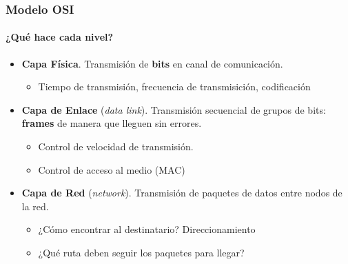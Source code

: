 \documentclass[letter]{beamer}
\begin{document}
\begin{frame}
  \frametitle{Modelo OSI}
  \framesubtitle{¿Qué hace cada nivel?}

  \begin{itemize}
    \item {\bf Capa Física}. Transmisión de {\bf bits} en canal de comunicación.
      \begin{itemize}
        \item Tiempo de transmisión, frecuencia de transmisición, codificación
      \end{itemize}
    \item {\bf Capa de Enlace} ({\em data link}). Transmisión secuencial de grupos de bits: {\bf frames}
          de manera que lleguen sin errores.
      \begin{itemize}
        \item Control de velocidad de transmisión.
        \item Control de acceso al medio (MAC)
      \end{itemize}
    \item {\bf Capa de Red} ({\em network}). Transmisión de paquetes de datos entre nodos de la red.
      \begin{itemize}
        \item ¿Cómo encontrar al destinatario? Direccionamiento
        \item ¿Qué ruta deben seguir los paquetes para llegar?
      \end{itemize}
  \end{itemize}
\end{frame}
\end{document}
